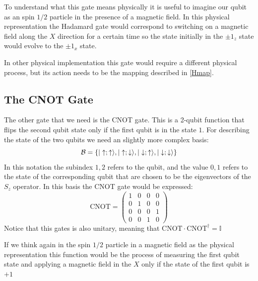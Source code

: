 To understand what this gate means physically it is useful to imagine our qubit as an spin $1/2$ particle in the presence of a magnetic field.
In this physical representation the Hadamard gate would correspond to switching on a magnetic field along the $X$ direction for a certain time so the state initially in the $\pm1_z$ state would evolve to the $\pm1_x$ state.

In other physical implementation this gate would require a different physical process, but its action needs to be the mapping described in \eqref{Hmap}.


\subsection{The CNOT Gate}
The other gate that we need is the CNOT gate. This is a 2-qubit function that flips the second qubit state only if the first qubit is in the state $1$. For describing the state of the two qubits we need an slightly more complex basis:
\begin{equation}
  \mathcal{B}=
  \left\{|\uparrow;\uparrow\rangle,|\uparrow;\downarrow\rangle,|\downarrow;\uparrow\rangle,|\downarrow;\downarrow\rangle\right\}
\end{equation}
 In this notation the subindex $1,2$ refers to the qubit, and the value $0,1$ refers to the state of the corresponding qubit that are chosen to be the eigenvectors of the $S_z$ operator.
In this basis the CNOT gate would be expressed:
\begin{equation}
  \text{CNOT}=\left(\begin{array}{cc|cc}
  1 & 0 & 0 & 0 \\
  0 & 1 & 0 & 0 \\\hline
  0 & 0 & 0 & 1 \\
  0 & 0 & 1 & 0
  \end{array}\right)
\end{equation}
Notice that this gates %
is also unitary, meaning that $\text{CNOT}\cdot\text{CNOT}^{\dagger}=\mathbb{I}$


If we think again in the spin $1/2$ particle in a magnetic field as the physical representation this function would be the process of measuring the first qubit state and applying a magnetic field in the $X$ only if the state of the first qubit is $+1$

